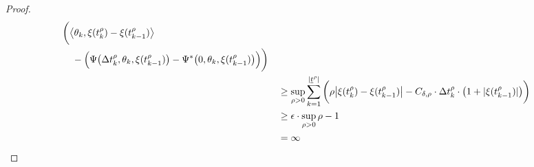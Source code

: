 \begin{proof}
\begin{align*}
\begin{aligned}[t]
      &\bigg( {\big\langle \theta_k , \xi(t^\rho_k)-\xi(t^\rho_{k-1}) \big\rangle} \\
      &\hspace{1em} -\Big(\Psi\big( \Delta t^\rho_k, \theta_k, \xi(t^\rho_{k-1}) \big) - \Psi^*\big(0, \theta_k, \xi(t^\rho_{k-1})\big) \Big) \bigg)\\
    \end{aligned} \\
    &\quad\geq \sup_{\rho>0} \sum_{k=1}^{|\underline t^\rho|} \bigg( \rho\big|\xi(t^\rho_k)-\xi(t^\rho_{k-1})\big| - C_{\delta,\rho} \cdot \Delta t^\rho_k \cdot \big( 1 + |\xi(t^\rho_{k-1})| \big) \bigg) \\
    &\quad\geq \epsilon \cdot \sup_{\rho>0} \rho - 1 \\
    &\quad= \infty
  \end{align*}
\end{proof}

